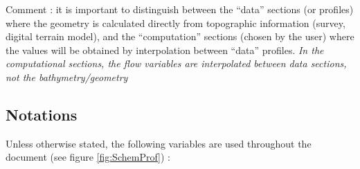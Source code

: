 \begin{CommentBlock}{Comment :}
it is important to distinguish between the ``data'' sections (or profiles) where the geometry is calculated directly from topographic information (survey, digital terrain model), and the ``computation'' sections (chosen by the user) where the values will be obtained by interpolation between ``data'' profiles.
\textit{In the computational sections, the flow variables are interpolated between data sections, not the bathymetry/geometry}
\end{CommentBlock}

\subsection{Notations} \label{secNot}

Unless otherwise stated, the following variables are used throughout the document (see figure \ref{fig:SchemProf}) :

